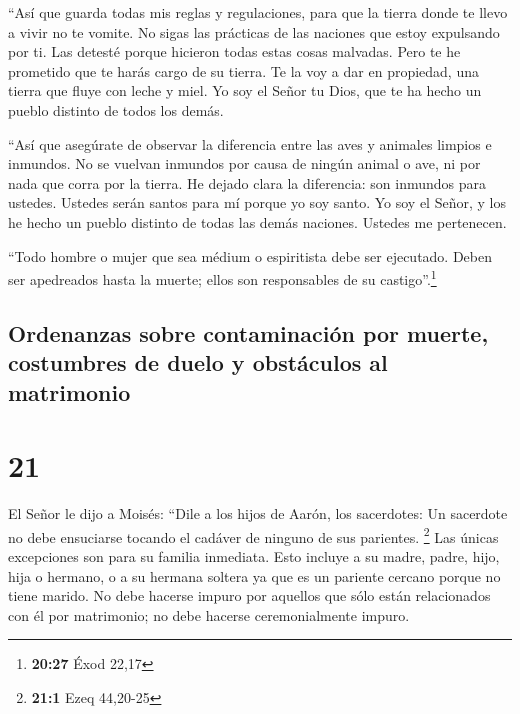  ``Así que guarda todas mis reglas y regulaciones, para
que la tierra donde te llevo a vivir no te vomite.  No
sigas las prácticas de las naciones que estoy expulsando por ti. Las
detesté porque hicieron todas estas cosas malvadas.  Pero
te he prometido que te harás cargo de su tierra. Te la voy a dar en
propiedad, una tierra que fluye con leche y miel. Yo soy el Señor tu
Dios, que te ha hecho un pueblo distinto de todos los demás.

 ``Así que asegúrate de observar la diferencia entre las
aves y animales limpios e inmundos. No se vuelvan inmundos por causa de
ningún animal o ave, ni por nada que corra por la tierra. He dejado
clara la diferencia: son inmundos para ustedes.  Ustedes
serán santos para mí porque yo soy santo. Yo soy el Señor, y los he
hecho un pueblo distinto de todas las demás naciones. Ustedes me
pertenecen.

 ``Todo hombre o mujer que sea médium o espiritista debe
ser ejecutado. Deben ser apedreados hasta la muerte; ellos son
responsables de su castigo''.\footnote{\textbf{20:27} Éxod 22,17}

\hypertarget{ordenanzas-sobre-contaminaciuxf3n-por-muerte-costumbres-de-duelo-y-obstuxe1culos-al-matrimonio}{%
\subsection{Ordenanzas sobre contaminación por muerte, costumbres de
duelo y obstáculos al
matrimonio}\label{ordenanzas-sobre-contaminaciuxf3n-por-muerte-costumbres-de-duelo-y-obstuxe1culos-al-matrimonio}}

\hypertarget{section-20}{%
\section{21}\label{section-20}}

 El Señor le dijo a Moisés: ``Dile a los hijos de Aarón,
los sacerdotes: Un sacerdote no debe ensuciarse tocando el cadáver de
ninguno de sus parientes. \footnote{\textbf{21:1} Ezeq 44,20-25}
 Las únicas excepciones son para su familia inmediata.
Esto incluye a su madre, padre, hijo, hija o hermano,  o a
su hermana soltera ya que es un pariente cercano porque no tiene marido.
 No debe hacerse impuro por aquellos que sólo están
relacionados con él por matrimonio; no debe hacerse ceremonialmente
impuro.

